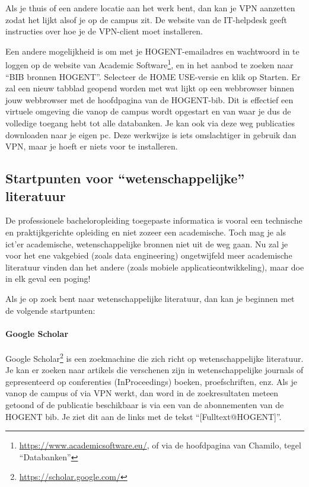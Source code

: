 Als je thuis of een andere locatie aan het werk bent, dan kan je VPN aanzetten zodat het lijkt alsof je op de campus zit. De website van de IT-helpdesk geeft instructies over hoe je de VPN-client moet installeren.

Een andere mogelijkheid is om met je HOGENT-emailadres en wachtwoord in te loggen op de website van Academic Software\footnote{\url{https://www.academicsoftware.eu/}, of via de hoofdpagina van Chamilo, tegel ``Databanken''}, en in het aanbod te zoeken naar ``BIB bronnen HOGENT''. Selecteer de HOME USE-versie en klik op Starten. Er zal een nieuw tabblad geopend worden met wat lijkt op een webbrowser binnen jouw webbrowser met de hoofdpagina van de HOGENT-bib. Dit is effectief een virtuele omgeving die vanop de campus wordt opgestart en van waar je dus de volledige toegang hebt tot alle databanken. Je kan ook via deze weg publicaties downloaden naar je eigen pc. Deze werkwijze is iets omslachtiger in gebruik dan VPN, maar je hoeft er niets voor te installeren.

\subsection{Startpunten voor ``wetenschappelijke'' literatuur}%
\label{ssec:startpunten-wetenschappelijke-literatuur}

De professionele bacheloropleiding toegepaste informatica is vooral een technische en praktijkgerichte opleiding en niet zozeer een academische. Toch mag je als ict'er academische, wetenschappelijke bronnen niet uit de weg gaan. Nu zal je voor het ene vakgebied (zoals data engineering) ongetwijfeld meer academische literatuur vinden dan het andere (zoals mobiele applicatieontwikkeling), maar doe in elk geval een poging!

Als je op zoek bent naar wetenschappelijke literatuur, dan kan je beginnen met de volgende startpunten:

\paragraph{Google Scholar}

Google Scholar\footnote{\url{https://scholar.google.com/}} is een zoekmachine die zich richt op wetenschappelijke literatuur. Je kan er zoeken naar artikels die verschenen zijn in wetenschappelijke journals of gepresenteerd op conferenties (InProceedings) boeken, proefschriften, enz. Als je vanop de campus of via VPN werkt, dan word in de zoekresultaten meteen getoond of de publicatie beschikbaar is via een van de abonnementen van de HOGENT bib. Je ziet dit aan de links met de tekst ``[Fulltext@HOGENT]''.

